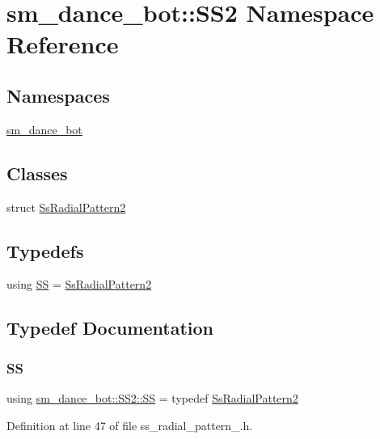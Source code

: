\hypertarget{namespacesm__dance__bot_1_1SS2}{}\section{sm\+\_\+dance\+\_\+bot\+:\+:S\+S2 Namespace Reference}
\label{namespacesm__dance__bot_1_1SS2}
\subsection*{Namespaces}
\begin{DoxyCompactItemize}
\item 
 \hyperlink{namespacesm__dance__bot_1_1SS2_1_1sm__dance__bot}{sm\+\_\+dance\+\_\+bot}
\end{DoxyCompactItemize}
\subsection*{Classes}
\begin{DoxyCompactItemize}
\item 
struct \hyperlink{structsm__dance__bot_1_1SS2_1_1SsRadialPattern2}{Ss\+Radial\+Pattern2}
\end{DoxyCompactItemize}
\subsection*{Typedefs}
\begin{DoxyCompactItemize}
\item 
using \hyperlink{namespacesm__dance__bot_1_1SS2_a3af437d3b5fb32a00b12e171154d9165}{SS} = \hyperlink{structsm__dance__bot_1_1SS2_1_1SsRadialPattern2}{Ss\+Radial\+Pattern2}
\end{DoxyCompactItemize}


\subsection{Typedef Documentation}
\mbox{\label{namespacesm__dance__bot_1_1SS2_a3af437d3b5fb32a00b12e171154d9165}} 
\subsubsection{\texorpdfstring{SS}{SS}}
{\footnotesize\ttfamily using \hyperlink{namespacesm__dance__bot_1_1SS2_a3af437d3b5fb32a00b12e171154d9165}{sm\+\_\+dance\+\_\+bot\+::\+S\+S2\+::\+SS} = typedef \hyperlink{structsm__dance__bot_1_1SS2_1_1SsRadialPattern2}{Ss\+Radial\+Pattern2}}



Definition at line 47 of file ss\+\_\+radial\+\_\+pattern\+\_.\+h.

